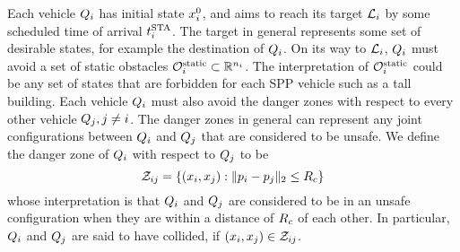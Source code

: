 

Each vehicle $Q_i$ has initial state $x^0_i$, and aims to reach its target $\mathcal{L}_i$ by some scheduled time of arrival $t^\text{STA}_i$. The target in general represents some set of desirable states, for example the destination of $Q_i$. %
On its way to $\mathcal{L}_i$, $Q_i$ must avoid a set of static obstacles $\mathcal{O}^\text{static}_i \subset \mathbb{R}^{n_i}$. The interpretation of $\mathcal{O}^\text{static}_i$ could be any set of states that are forbidden for each SPP vehicle such as a tall building. Each vehicle $Q_i$ must also avoid the danger zones with respect to every other vehicle $Q_j, j\neq i$. The danger zones in general can represent any joint configurations between $Q_i$ and $Q_j$ that are considered to be unsafe. We define the danger zone of $Q_i$ with respect to $Q_j$ to be
\begin{equation} \label{eqn:danger_zone_defn}
\dz_{ij} = \{(\state_i, \state_j): \|\pos_i - \pos_j\|_2 \le \rc\}
\end{equation}
\noindent whose interpretation is that $Q_i$ and $Q_j$ are considered to be in an unsafe configuration when they are within a distance of $R_c$ of each other. In particular, $Q_i$ and $Q_j$ are said to have collided, if $(x_i, x_j) \in \mathcal{Z}_{ij}$.

